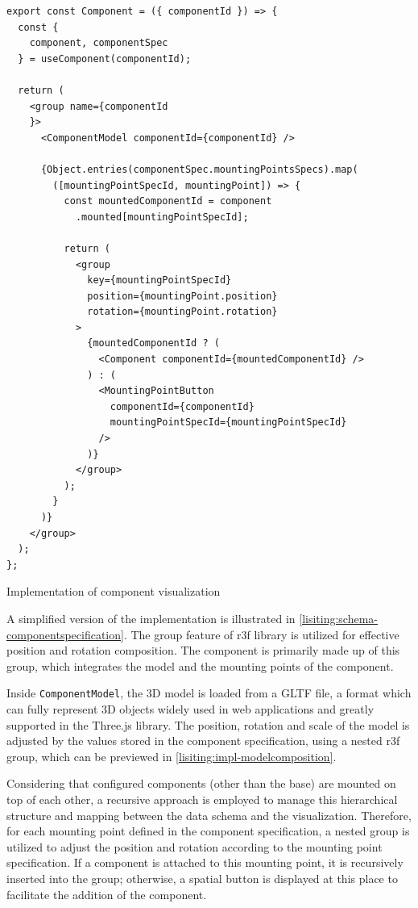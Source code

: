 \begin{listing}[h!]
\begin{verbatim}
export const Component = ({ componentId }) => {
  const { 
    component, componentSpec
  } = useComponent(componentId);

  return (
    <group name={componentId
    }>
      <ComponentModel componentId={componentId} />

      {Object.entries(componentSpec.mountingPointsSpecs).map(
        ([mountingPointSpecId, mountingPoint]) => {
          const mountedComponentId = component
            .mounted[mountingPointSpecId];

          return (
            <group
              key={mountingPointSpecId}
              position={mountingPoint.position}
              rotation={mountingPoint.rotation}
            >
              {mountedComponentId ? (
                <Component componentId={mountedComponentId} />
              ) : (
                <MountingPointButton
                  componentId={componentId}
                  mountingPointSpecId={mountingPointSpecId}
                />
              )}
            </group>
          );
        }
      )}
    </group>
  );
};
\end{verbatim}
\caption{Implementation of component visualization}
\label{lisiting:impl-visulaization1}
\end{listing}

A simplified version of the implementation is illustrated in \autoref{lisiting:schema-componentspecification}. The group feature of \acrshort{r3f} library is utilized for effective position and rotation composition. The component is primarily made up of this group, which integrates the model and the mounting points of the component.

Inside \texttt{ComponentModel}, the 3D model is loaded from a GLTF file, a format which can fully represent 3D objects widely used in web applications and greatly supported in the Three.js library. The position, rotation and scale of the model is adjusted by the values stored in the component specification, using a nested \acrshort{r3f} group, which can be previewed in \autoref{lisiting:impl-modelcomposition}.

Considering that configured components (other than the base) are mounted on top of each other, a recursive approach is employed to manage this hierarchical structure and mapping between the data schema and the visualization. Therefore, for each mounting point defined in the component specification, a nested group is utilized to adjust the position and rotation according to the mounting point specification. If a component is attached to this mounting point, it is recursively inserted into the group; otherwise, a spatial button is displayed at this place to facilitate the addition of the component. 

